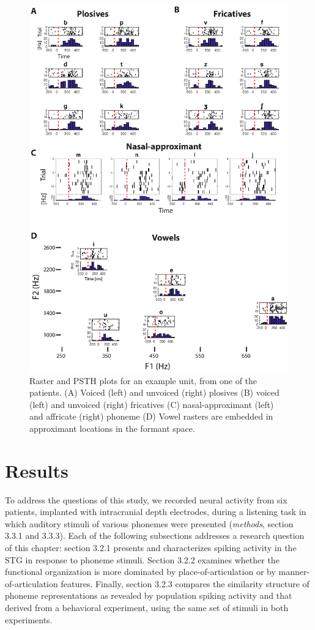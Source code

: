 \begin{figure}[H]
\vspace{.3in}
\includegraphics[width=\linewidth]{Figures/Ch3/Figure2_new.eps}
\caption{Raster and PSTH plots for an example unit, from one of the patients. (A) Voiced (left) and unvoiced (right) plosives (B) voiced (left) and unvoiced (right) fricatives (C)  nasal-approximant (left) and affricate (right) phoneme (D) Vowel rasters are embedded in approximant locations in the formant space.}
\end{figure}

\section{Results}
To address the questions of this study, we recorded neural activity from six patients, implanted with intracranial depth electrodes, during a listening task in which auditory stimuli of various phonemes were presented (\textit{methods}, section 3.3.1 and 3.3.3). Each of the following subsections addresses a research question of this chapter: section 3.2.1 presents and characterizes spiking activity in the STG in response to phoneme stimuli. Section 3.2.2 examines whether the functional organization is more dominated by place-of-articulation or by manner-of-articulation features. Finally, section 3.2.3 compares the similarity structure of phoneme representations as revealed by population spiking activity and that derived from a behavioral experiment, using the same set of stimuli in both experiments.


